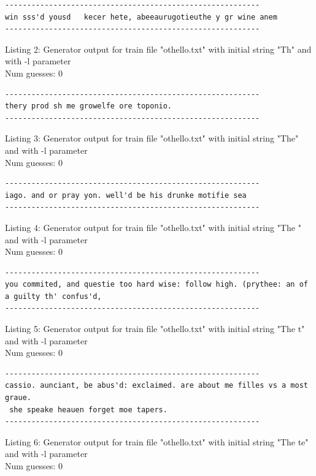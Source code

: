 \documentclass{article}
\begin{document}
\begin{lstlisting}
----------------------------------------------------------
win sss'd yousd   kecer hete, abeeaurugotieuthe y gr wine anem
----------------------------------------------------------
\end{lstlisting}

Listing 2: Generator output for train file "othello.txt" with initial string "Th" and with -l parameter
\\Num guesses: 0

\begin{lstlisting}
----------------------------------------------------------
thery prod sh me growelfe ore toponio.
----------------------------------------------------------
\end{lstlisting}

Listing 3: Generator output for train file "othello.txt" with initial string "The" and with -l parameter
\\Num guesses: 0

\begin{lstlisting}
----------------------------------------------------------
iago. and or pray yon. well'd be his drunke motifie sea
----------------------------------------------------------
\end{lstlisting}

Listing 4: Generator output for train file "othello.txt" with initial string "The " and with -l parameter
\\Num guesses: 0

\begin{lstlisting}
----------------------------------------------------------
you commited, and questie too hard wise: follow high. (prythee: an of a guilty th' confus'd,
----------------------------------------------------------
\end{lstlisting}

Listing 5: Generator output for train file "othello.txt" with initial string "The t" and with -l parameter
\\Num guesses: 0

\begin{lstlisting}
----------------------------------------------------------
cassio. aunciant, be abus'd: exclaimed. are about me filles vs a most graue.
 she speake heauen forget moe tapers.
----------------------------------------------------------
\end{lstlisting}

Listing 6: Generator output for train file "othello.txt" with initial string "The te" and with -l parameter
\\Num guesses: 0
\end{document}
